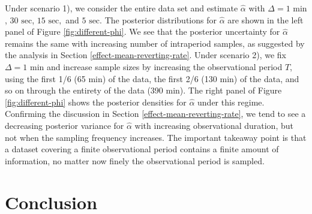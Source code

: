 \documentclass[10pt]{article}
\newcommand{\halpha}{\hat{\alpha}}
\begin{document}
Under scenario 1), we consider the entire data set and estimate $\halpha$ with $\Delta = 1 \mbox{ min}$, $30 \mbox{ sec}$, $15 \mbox{ sec},$ and $5 \mbox{ sec}$. The posterior distributions for $\halpha$ are shown in the left panel of Figure \ref{fig:different-phi}. We see that the posterior uncertainty for $\halpha$ remains the same with increasing number of intraperiod samples, as suggested by the analysis in Section \ref{effect-mean-reverting-rate}. Under scenario 2), we fix $\Delta = 1 \mbox{ min}$ and increase sample sizes by increasing the observational period $T$, using the first 1/6 (65 min) of the data, the first 2/6 (130 min) of the data, and so on through the entirety of the data (390 min). The right panel of Figure \ref{fig:different-phi} shows the posterior densities for $\halpha$ under this regime. Confirming the discussion in Section \ref{effect-mean-reverting-rate}, we tend to see a decreasing posterior variance for $\halpha$ with increasing observational duration, but not when the sampling frequency increases.  The important takeaway point is that a dataset covering a finite observational period contains a finite amount of information, no matter now finely the observational period is sampled.


\section{Conclusion}
\end{document}
